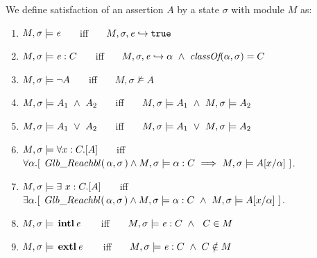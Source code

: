 \begin{definition} 
\label{def:chainmail-semantics}
We define satisfaction of an assertion $A$ by a %
state $\sigma$ with 
 module $M$ as:
\begin{enumerate}
\item
\label{cExpr}
$M , \sigma \models {\mathit{e}}$ \ \ \ iff \ \ \  $M, \sigma, {\mathit{e}} \hookrightarrow \texttt{true}$
\item
\label{cClass}
$M , \sigma \models {{\mathit{e}}} : C$ \ \ \ iff \ \ \  $M, \sigma, {\mathit{e}} \hookrightarrow \alpha\   \wedge \ \textit{classOf}(\alpha, \sigma)= C$
\item
$M , \sigma \models \neg A$ \ \ \ iff \ \ \  ${M},{\sigma}\nvDash{A}$
\item
$\satisfiesA{M}{\sigma}{A_1\ \wedge\ A_2}$ \ \ \ iff \ \ \  $\satisfiesA{M}{\sigma}{A_1} \   \wedge \ \satisfiesA{M}{\sigma}{A_2}$
\item
$\satisfiesA{M}{\sigma}{A_1\ \vee\ A_2}$ \ \ \ iff \ \ \  $\satisfiesA{M}{\sigma}{A_1}\   \vee \ \satisfiesA{M}{\sigma}{A_2}$

\item
\label{quant1}
$M , \sigma \models \forall x:C.[A]$ \ \ \ iff \ \ \  
 {$\forall \alpha.[\ \GRelevant \alpha \sigma \wedge  \satisfiesA {M}{\sigma} {\alpha:C}  \ \Longrightarrow   \ \satisfiesA{M}{\sigma} {A[x/\alpha]}\ ]$.} 

\item
\label{quant2}
$M , \sigma \models \exists\ x:C.[A]$ \ \ \ iff \ \ \  
 {$\exists \alpha.[\ \GRelevant \alpha \sigma \wedge  \satisfiesA {M}{\sigma} {\alpha:C}  \ \wedge \ \satisfiesA{M}{\sigma} {A[x/\alpha]}\ ]$.} 
\item
\label{cInternal}
$M , \sigma \models {\ensuremath{\, \mathbf{intl}}\, {\mathit{e}}\, }$ \ \ \ iff \ \ \   $M , \sigma \models {{\mathit{e}}} : C \ \wedge\ \ C \in M$
\item
\label{cExternal}
$M , \sigma \models {\ensuremath{\, \mathbf{extl}}\, {\mathit{e}}\, }$ \ \ \ iff \ \ \   $M , \sigma \models {{\mathit{e}}} : C \ \wedge \ C \notin M$
\end{enumerate}
\end{definition}


